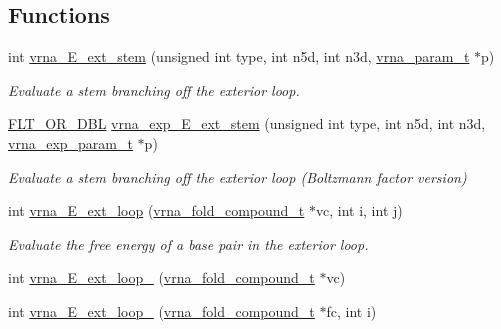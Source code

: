 \subsection*{Functions}
\begin{DoxyCompactItemize}
\item 
int \mbox{\hyperlink{group__loops_gaa0c313c90da11aa741dcd62746d85337}{vrna\+\_\+\+E\+\_\+ext\+\_\+stem}} (unsigned int type, int n5d, int n3d, \mbox{\hyperlink{group__energy__parameters_ga8a69ca7d787e4fd6079914f5343a1f35}{vrna\+\_\+param\+\_\+t}} $\ast$p)
\begin{DoxyCompactList}\small\item\em Evaluate a stem branching off the exterior loop. \end{DoxyCompactList}\item 
\mbox{\hyperlink{group__data__structures_ga31125aeace516926bf7f251f759b6126}{F\+L\+T\+\_\+\+O\+R\+\_\+\+D\+BL}} \mbox{\hyperlink{group__loops_ga357484958d3cd677f88f16c75c8a5730}{vrna\+\_\+exp\+\_\+\+E\+\_\+ext\+\_\+stem}} (unsigned int type, int n5d, int n3d, \mbox{\hyperlink{group__energy__parameters_ga01d8b92fe734df8d79a6169482c7d8d8}{vrna\+\_\+exp\+\_\+param\+\_\+t}} $\ast$p)
\begin{DoxyCompactList}\small\item\em Evaluate a stem branching off the exterior loop (Boltzmann factor version) \end{DoxyCompactList}\item 
int \mbox{\hyperlink{group__loops_gafe7e94269aaae793a09427364ebb1ec0}{vrna\+\_\+\+E\+\_\+ext\+\_\+loop}} (\mbox{\hyperlink{group__fold__compound_ga1b0cef17fd40466cef5968eaeeff6166}{vrna\+\_\+fold\+\_\+compound\+\_\+t}} $\ast$vc, int i, int j)
\begin{DoxyCompactList}\small\item\em Evaluate the free energy of a base pair in the exterior loop. \end{DoxyCompactList}\item 
int \mbox{\hyperlink{group__loops_ga5dfb0f165d3a69a1a1ba82ace3002f0d}{vrna\+\_\+\+E\+\_\+ext\+\_\+loop\+\_}} (\mbox{\hyperlink{group__fold__compound_ga1b0cef17fd40466cef5968eaeeff6166}{vrna\+\_\+fold\+\_\+compound\+\_\+t}} $\ast$vc)
\item 
int \mbox{\hyperlink{group__loops_ga6e57363a8ff3597cc69181c33fbb8196}{vrna\+\_\+\+E\+\_\+ext\+\_\+loop\+\_}} (\mbox{\hyperlink{group__fold__compound_ga1b0cef17fd40466cef5968eaeeff6166}{vrna\+\_\+fold\+\_\+compound\+\_\+t}} $\ast$fc, int i)
\item 

\end{DoxyCompactItemize}

